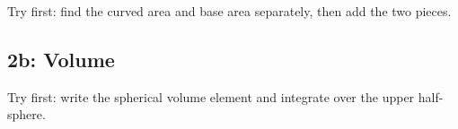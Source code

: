 \documentclass[11pt]{article}
\begin{document}
\begin{keepsection}
\begin{keepsection}
Try first: find the curved area and base area separately, then add the two pieces.

\end{keepsection}

\begin{keepsection}
\subsection{2b: Volume}

Try first: write the spherical volume element and integrate over the upper half-sphere.

\end{keepsection}
\end{keepsection}
\end{document}
